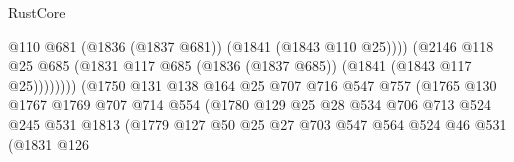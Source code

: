 \begin{lexlean}{RustCore}
\begin{coremodule}
                                                @110
                                                @681
                                                (@1836 (@1837 @681))
                                                (@1841 (@1843 @110 @25))))
                                            (@2146
                                              @118
                                              @25
                                              @685
                                              (@1831
                                                @117
                                                @685
                                                (@1836 (@1837 @685))
                                                (@1841 (@1843 @117 @25))))))))
                                    (@1750
                                      @131
                                      @138
                                      @164
                                      @25
                                      @707
                                      @716
                                      @547
                                      @757
                                      (@1765
                                        @130
                                        @1767
                                        @1769
                                        @707
                                        @714
                                        @554
                                        (@1780
                                          @129
                                          @25
                                          @28
                                          @534
                                          @706
                                          @713
                                          @524
                                          @245
                                          @531
                                          @1813
                                          (@1779
                                            @127
                                            @50
                                            @25
                                            @27
                                            @703
                                            @547
                                            @564
                                            @524
                                            @46
                                            @531
                                            (@1831
                                              @126

\end{coremodule}
\end{lexlean}
